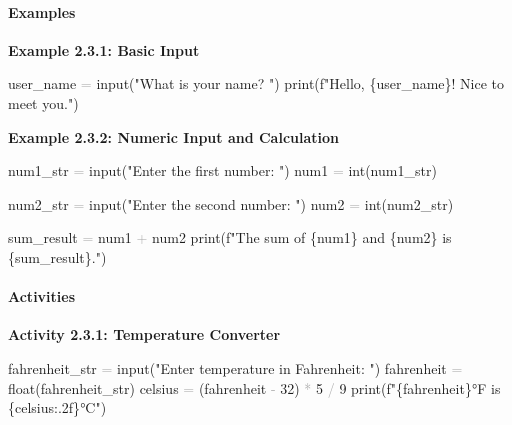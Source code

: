 \documentclass[
  justified,
  openright,
]{tufte-book}
\let\subsection\paragraph
\let\paragraph\paragraph
\newcommand{\StringTok}[1]{\textcolor{CodeString}{#1}}              %
\newcommand{\CodeNumTok}[1]{\textcolor{CodeNumber}{#1}}             %
\newcommand{\OperatorTok}[1]{\textcolor{DarkGray}{#1}}              %
\newenvironment{Shaded}{%
  \begin{mdframed}[style=TufteCode]%
}{%
  \end{mdframed}%
}
\let\subsection\paragraph
\let\paragraph\paragraph
\begin{document}
\subsection{Examples}\label{examples-3}

\textbf{Example 2.3.1: Basic Input}

\begin{Shaded}
\begin{Highlighting}[]
user\_name \OperatorTok{=} input(\StringTok{"What is your name? "})
print(\StringTok{f"Hello, }\StringTok{\{}user\_name\StringTok{\}}\StringTok{! Nice to meet you."})
\end{Highlighting}
\end{Shaded}

\textbf{Example 2.3.2: Numeric Input and Calculation}

\begin{Shaded}
\begin{Highlighting}[]
num1\_str \OperatorTok{=} input(\StringTok{"Enter the first number: "})
num1 \OperatorTok{=} int(num1\_str)
 
num2\_str \OperatorTok{=} input(\StringTok{"Enter the second number: "})
num2 \OperatorTok{=} int(num2\_str)
 
sum\_result \OperatorTok{=} num1 \OperatorTok{+} num2
print(\StringTok{f"The sum of }\StringTok{\{}num1\StringTok{\}}\StringTok{ and }\StringTok{\{}num2\StringTok{\}}\StringTok{ is }\StringTok{\{}sum\_result\StringTok{\}}\StringTok{."})
\end{Highlighting}
\end{Shaded}

\subsection{Activities}\label{activities-4}

\textbf{Activity 2.3.1: Temperature Converter}

\begin{Shaded}
\begin{Highlighting}[]
fahrenheit\_str \OperatorTok{=} input(\StringTok{"Enter temperature in Fahrenheit: "})
fahrenheit \OperatorTok{=} float(fahrenheit\_str)
celsius \OperatorTok{=} (fahrenheit \OperatorTok{{-}} \CodeNumTok{32}) \OperatorTok{*} \CodeNumTok{5} \OperatorTok{/} \CodeNumTok{9}
print(\StringTok{f"}\StringTok{\{}fahrenheit\StringTok{\}}\StringTok{°F is }\StringTok{\{}celsius\StringTok{:.2f\}}\StringTok{°C"})
\end{Highlighting}
\end{Shaded}
\end{document}
